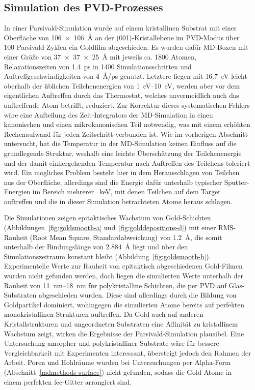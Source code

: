 \subsection{Simulation des PVD-Prozesses}

In einer Parsivald-Simulation wurde auf einem kristallinen Substrat mit einer Oberfläche von \SI{106x106}{\angstrom} an der (001)-Kristallebene im PVD-Modus über 100 Parsivald-Zyklen ein Goldfilm abgeschieden.
Es wurden dafür MD-Boxen mit einer Größe von \SI{37x37x25}{\angstrom} mit jeweils ca. \num{1800} Atomen, Relaxationszeiten von \SI{1.4}{\pico\second} in \num{1400} Simulationsschritten und Auftreffgeschwindigkeiten von \SI{4}{\angstrom/\pico\second} genutzt.
Letztere liegen mit \SI{16.7}{\electronvolt} leicht oberhalb der üblichen Teilchenenergien von \SIrange{1}{10}{\electronvolt}\cite{thompson_ii._1968}, werden aber vor dem eigentlichen Auftreffen durch das Thermostat, welches unvermeidlich auch das auftreffende Atom betrifft, reduziert.
Zur Korrektur dieses systematischen Fehlers wäre eine Aufteilung des Zeit-Integrators der MD-Simulation in einen kanonischen und einen mikrokanonischen Teil notwendig, was mit einem erhöhten Rechenaufwand für jeden Zeitschritt verbunden ist.
Wie im vorherigen Abschnitt untersucht, hat die Temperatur in der MD-Simulation keinen Einfluss auf die grundlegende Struktur, weshalb eine leichte Überschätzung der Teilchenenergie und der damit einhergehenden Temperatur nach Auftreffen des Teilchens toleriert wird.
Ein mögliches Problem besteht hier in dem Herausschlagen von Teilchen aus der Oberfläche, allerdings sind die Energie dafür unterhalb typischer Sputter-Energien im Bereich mehrerer \SI{}{\kilo\electronvolt}\cite{mattox_handbook_2010}, mit denen Teilchen auf dem Target auftreffen und die in dieser Simulation betrachteten Atome heraus schlagen.

Die Simulationen zeigen epitaktisches Wachstum von Gold-Schichten (Abbildungen~\ref{fig:goldsmooth-a} und~\ref{fig:golddepositions-d}) mit einer RMS-Rauheit (Root Mean Square, Standardabweichung) von \SI{1.2}{\angstrom}, die somit unterhalb der Bindungslänge von \SI{2.884}{\angstrom} liegt und über den Simulationszeitraum konstant bleibt (Abbildung~\ref{fig:goldsmooth-b}).
Experimentelle Werte zur Rauheit von epitaktisch abgeschiedenen Gold-Filmen wurden nicht gefunden werden, doch liegen die simulierten Werte unterhalb der Rauheit von \SIrange{11}{18}{\nano\meter} für polykristalline Schichten, die per PVD auf Glas-Substraten abgeschieden wurden\cite{svorcik_annealing_2011}.
Diese sind allerdings durch die Bildung von Goldpartikel dominiert, wohingegen die simulierten Atome bereits auf perfekten monokristallinen Strukturen auftreffen.
Da Gold auch auf anderen Kristallstrukturen und ungeordneten Substraten eine Affinität zu kristallinem Wachstum zeigt\cite{gottsche_uber_1956,everitt_evolution_2000}, wirken die Ergebnisse der Parsivald-Simulation plausibel.
Eine Untersuchung amorpher und polykristalliner Substrate wäre für bessere Vergleichbarkeit mit Experimenten\cite{adamov_electrical_1974} interessant, übersteigt jedoch den Rahmen der Arbeit.
Poren und Hohlräume wurden bei Untersuchungen per Alpha-Form (Abschnitt~\ref{mdmethods-surface}) nicht gefunden, sodass die Gold-Atome in einem perfekten fcc-Gitter arrangiert sind.

